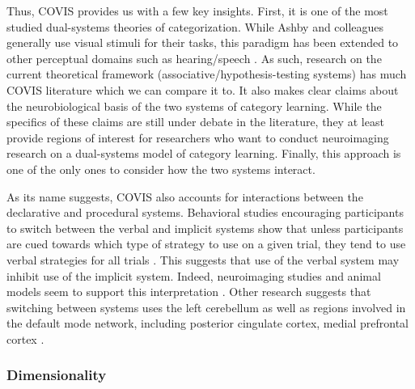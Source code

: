 \documentclass[../dissertation.tex]{subfiles}
\begin{document}
	Thus, COVIS provides us with a few key insights. First, it is one of the most studied dual-systems theories of categorization. While Ashby and colleagues generally use visual stimuli for their tasks, this paradigm has been extended to other perceptual domains such as hearing/speech \citep{Chandrasekaran2014, Chandrasekaran2016}. As such, research on the current theoretical framework (associative/hypothesis-testing systems) has much COVIS literature which we can compare it to. It also makes clear claims about the neurobiological basis of the two systems of category learning. While the specifics of these claims are still under debate in the literature, they at least provide regions of interest for researchers who want to conduct neuroimaging research on a dual-systems model of category learning. Finally, this approach is one of the only ones to consider how the two systems interact. \par
	As its name suggests, COVIS also accounts for interactions between the declarative and procedural systems. Behavioral studies encouraging participants to switch between the verbal and implicit systems show that unless participants are cued towards which type of strategy to use on a given trial, they tend to use verbal strategies for all trials \citep{Ashby2010, Erickson2008}. This suggests that use of the verbal system may inhibit use of the implicit system. Indeed, neuroimaging studies and animal models seem to support this interpretation \citep{Foerde2006, Packard1996}. Other research suggests that switching between systems uses the left cerebellum as well as regions involved in the default mode network, including posterior cingulate cortex, medial prefrontal cortex \citep{Turner2017}.
	
\subsubsection{Dimensionality}
\end{document}
